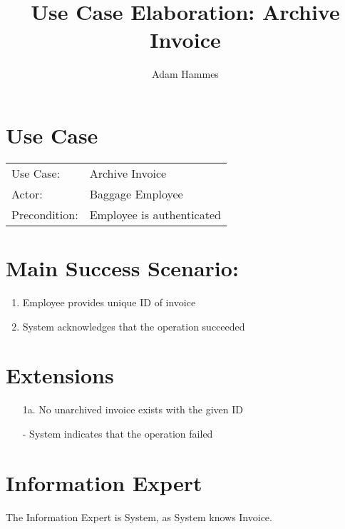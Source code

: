 \documentclass{article}
\title{Use Case Elaboration: Archive Invoice}
\author{ Adam Hammes }
\begin{document}
\maketitle


\section*{Use Case}
\begin{tabular}{l l}
Use Case:     & Archive Invoice\\
Actor:        & Baggage Employee\\
Precondition: & Employee is authenticated\\
\end{tabular}
 

\section*{Main Success Scenario:}

\begin{enumerate}
    \item Employee provides unique ID of invoice
    \item System acknowledges that the operation succeeded

\end{enumerate}

\section*{Extensions}

\begin{itemize}
    \item [1a.] No unarchived invoice exists with the given ID
    
    - System indicates that the operation failed
\end{itemize}

\section*{Information Expert}

The Information Expert is System, as System knows Invoice.
\end{document}
